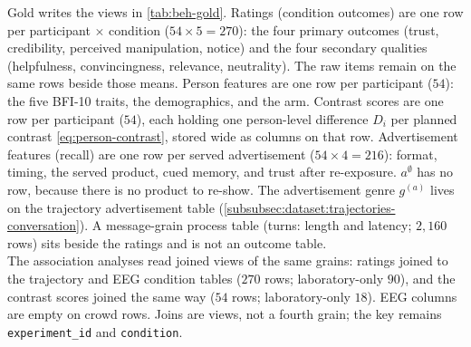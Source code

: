Gold writes the views in \autoref{tab:beh-gold}.
Ratings (condition outcomes) are one row per participant \(\times\) condition (\(54\times 5=270\)): the four primary outcomes (trust, credibility, perceived manipulation, notice) and the four secondary qualities (helpfulness, convincingness, relevance, neutrality).
The raw items remain on the same rows beside those means.
Person features are one row per participant (\(54\)): the five BFI-10 traits, the demographics, and the arm.
Contrast scores are one row per participant (\(54\)), each holding one person-level difference \(D_i\) per planned contrast \eqref{eq:person-contrast}, stored wide as columns on that row.
Advertisement features (recall) are one row per served advertisement (\(54\times 4=216\)): format, timing, the served product, cued memory, and trust after re-exposure.
\(a^{\emptyset}\) has no row, because there is no product to re-show.
The advertisement genre \(g^{(a)}\) lives on the trajectory advertisement table (\autoref{subsubsec:dataset:trajectories-conversation}).
A message-grain process table (turns: length and latency; \(2{,}160\) rows) sits beside the ratings and is not an outcome table.
\\

The association analyses read joined views of the same grains: ratings joined to the trajectory and EEG condition tables (\(270\) rows; laboratory-only \(90\)), and the contrast scores joined the same way (\(54\) rows; laboratory-only \(18\)).
EEG columns are empty on crowd rows.
Joins are views, not a fourth grain; the key remains \texttt{experiment\_id} and \texttt{condition}.
\\

